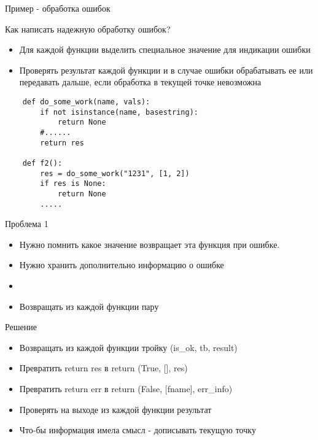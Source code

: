 \documentclass{article}
\begin{document}
\LARGE

\begin{center} Пример - обработка ошибок \end{center}
Как написать надежную обработку ошибок?
\begin{itemize}
	\item Для каждой функции выделить специальное значение для индикации ошибки
	\item Проверять результат каждой функции и в случае ошибки обрабатывать
	       ее или передавать дальше, если обработка в текущей точке невозможна
\end{itemize}

\begin{lstlisting}
	def do_some_work(name, vals):
		if not isinstance(name, basestring):
			return None
		#......
		return res

	def f2():
		res = do_some_work("1231", [1, 2])
		if res is None:
			return None
		.....
\end{lstlisting}
\newpage

\begin{center} Проблема 1 \end{center}
\begin{itemize}
	\item Нужно помнить какое значение возвращает эта функция при ошибке.
	\item Нужно хранить дополнительно информацию о ошибке
	\item
	\item Возвращать из каждой функции пару
\end{itemize}
\newpage

\begin{center} Решение \end{center}
\begin{itemize}
	\item Возвращать из каждой функции тройку (is_ok, tb, result)
	\item Превратить return res в return (True, [], res)
	\item Превратить return err в return (False, [fname], err_info)
	\item Проверять на выходе из каждой функции результат
	\item Что-бы информация имела смысл - дописывать текущую точку
\end{itemize}
\newpage
\end{document}
